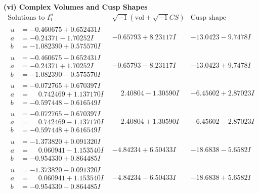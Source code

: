 \documentclass[1p]{elsarticle_modified}
\theoremstyle{definition}
\newcommand{\I}{\sqrt{-1}}
\begin{document}
\newpage\flushleft \textbf{(vi) Complex Volumes and Cusp Shapes}
$$\begin{array}{c|c|c}  
\text{Solutions to }I^u_{1}& \I (\text{vol} + \sqrt{-1}CS) & \text{Cusp shape}\\
 \hline 
\begin{aligned}
u &= -0.460675 + 0.652431 I \\
a &= -0.24371 - 1.70252 I \\
b &= -1.082390 + 0.575570 I\end{aligned}
 & -0.65793 + 8.23117 I & -13.0423 - 9.7478 I \\ \hline\begin{aligned}
u &= -0.460675 - 0.652431 I \\
a &= -0.24371 + 1.70252 I \\
b &= -1.082390 - 0.575570 I\end{aligned}
 & -0.65793 - 8.23117 I & -13.0423 + 9.7478 I \\ \hline\begin{aligned}
u &= -0.072765 + 0.670397 I \\
a &= \phantom{-}0.742469 + 1.137170 I \\
b &= -0.597448 - 0.616549 I\end{aligned}
 & \phantom{-}2.40804 - 1.30590 I & -6.45602 + 2.87023 I \\ \hline\begin{aligned}
u &= -0.072765 - 0.670397 I \\
a &= \phantom{-}0.742469 - 1.137170 I \\
b &= -0.597448 + 0.616549 I\end{aligned}
 & \phantom{-}2.40804 + 1.30590 I & -6.45602 - 2.87023 I \\ \hline\begin{aligned}
u &= -1.373820 + 0.091320 I \\
a &= \phantom{-}0.060941 - 1.153540 I \\
b &= -0.954330 + 0.864485 I\end{aligned}
 & -4.84234 + 6.50433 I & -18.6838 - 5.6582 I \\ \hline\begin{aligned}
u &= -1.373820 - 0.091320 I \\
a &= \phantom{-}0.060941 + 1.153540 I \\
b &= -0.954330 - 0.864485 I\end{aligned}
 & -4.84234 - 6.50433 I & -18.6838 + 5.6582 I \\ \hline\begin{aligned}

\end{aligned}
\end{array}$$
\end{document}
